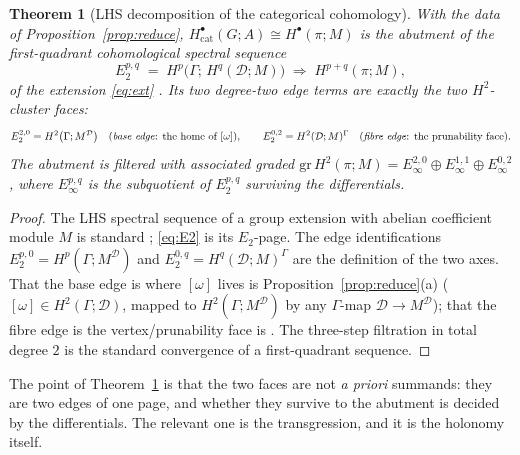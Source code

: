 \documentclass[11pt]{article}
\newtheorem{theorem}{Theorem}
\theoremstyle{definition}
\newcommand{\D}{\mathcal{D}}
\begin{document}
\begin{theorem}[LHS decomposition of the categorical cohomology]\label{thm:lhs}
With the data of Proposition~\ref{prop:reduce}, $H^\bullet_{\mathrm{cat}}(G;A)\cong
H^\bullet(\pi;M)$ is the abutment of the first-quadrant cohomological spectral
sequence
\begin{equation}\label{eq:E2}
   E_2^{p,q}\;=\;H^p\bigl(\Gamma;\,H^q(\D;M)\bigr)\;\Longrightarrow\;H^{p+q}(\pi;M),
\end{equation}
of the extension \eqref{eq:ext} \cite[\S6.8]{weibel}. Its two degree-two edge
terms are exactly the two $H^2$-cluster faces:
\[
   E_2^{2,0}=H^2\bigl(\Gamma;M^\D\bigr)
   \quad\text{(\emph{base edge}: the home of $[\omega]$)},
   \qquad
   E_2^{0,2}=H^2(\D;M)^\Gamma
   \quad\text{(\emph{fibre edge}: the prunability face)} .
\]
The abutment is filtered with associated graded
$\mathrm{gr}\,H^2(\pi;M)=E_\infty^{2,0}\oplus E_\infty^{1,1}\oplus E_\infty^{0,2}$,
where $E_\infty^{p,q}$ is the subquotient of $E_2^{p,q}$ surviving the
differentials.
\end{theorem}
\begin{proof}
The LHS spectral sequence of a group extension with abelian coefficient module
$M$ is standard \cite[Thm.~6.8.2]{weibel}; \eqref{eq:E2} is its $E_2$-page. The
edge identifications $E_2^{p,0}=H^p(\Gamma;M^\D)$ and
$E_2^{0,q}=H^q(\D;M)^\Gamma$ are the definition of the two axes. That the base
edge is where $[\omega]$ lives is Proposition~\ref{prop:reduce}(a)
($[\omega]\in H^2(\Gamma;\D)$, mapped to $H^2(\Gamma;M^\D)$ by any $\Gamma$-map
$\D\to M^\D$); that the fibre edge is the vertex/prunability face is
\cite{sep,sep2}. The three-step filtration in total degree $2$ is the standard
convergence of a first-quadrant sequence.
\end{proof}

The point of Theorem~\ref{thm:lhs} is that the two faces are not
\emph{a priori} summands: they are two edges of one page, and whether they
survive to the abutment is decided by the differentials. The relevant one is the
transgression, and it is the holonomy itself.
\end{document}
